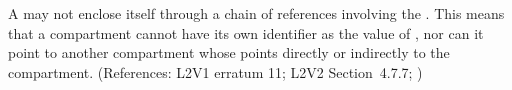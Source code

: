 A \Compartment may not enclose itself through a chain of references
involving the  .  This means that a compartment cannot
have its own identifier as the value of , nor can it point
to another compartment whose   points directly or
indirectly to the compartment.  (References: L2V1 erratum 11; L2V2 Section~4.7.7;
)
